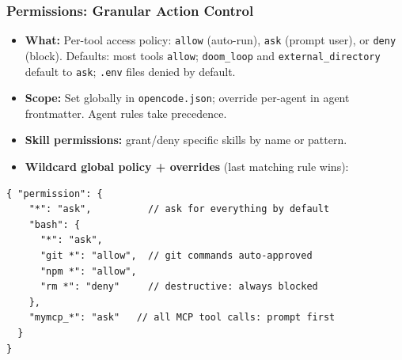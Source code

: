 \begin{frame}[fragile]\frametitle{Permissions:  Granular Action Control}
  \begin{itemize}
    \item \textbf{What:} Per-tool access policy:  \texttt{allow} (auto-run), \texttt{ask} (prompt user), or \texttt{deny} (block). Defaults: most tools \texttt{allow}; \texttt{doom\_loop} and \texttt{external\_directory} default to \texttt{ask}; \texttt{.env} files denied by default.
    \item \textbf{Scope:} Set globally in \texttt{opencode.json}; override per-agent in agent frontmatter. Agent rules take precedence.

    \item \textbf{Skill permissions:} grant/deny specific skills by name or pattern.
	\item \textbf{Wildcard global policy + overrides} (last matching rule wins):

  \end{itemize}
  
\begin{lstlisting}
{ "permission": {
    "*": "ask",          // ask for everything by default
    "bash": {
      "*": "ask",
      "git *": "allow",  // git commands auto-approved
      "npm *": "allow",
      "rm *": "deny"     // destructive: always blocked
    },
    "mymcp_*": "ask"   // all MCP tool calls: prompt first
  }
}
\end{lstlisting}  
\end{frame}

